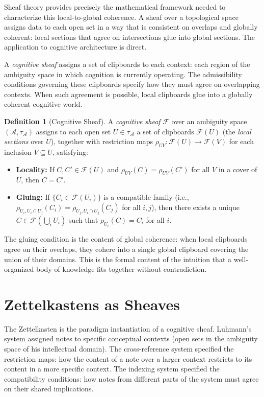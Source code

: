\documentclass[12pt,oneside]{book}
\theoremstyle{plain}
\theoremstyle{definition}
\newtheorem{definition}[theorem]{Definition}
\theoremstyle{plain}
\newcommand{\cA}{\mathcal{A}}
\begin{document}
Sheaf theory provides precisely the mathematical framework needed to characterize this local-to-global coherence. A sheaf over a topological space assigns data to each open set in a way that is consistent on overlaps and globally coherent: local sections that agree on intersections glue into global sections. The application to cognitive architecture is direct.

A \emph{cognitive sheaf} assigns a set of clipboards to each context: each region of the ambiguity space in which cognition is currently operating. The admissibility conditions governing these clipboards specify how they must agree on overlapping contexts. When such agreement is possible, local clipboards glue into a globally coherent cognitive world.

\begin{definition}[Cognitive Sheaf]
A \emph{cognitive sheaf} $\mathcal{F}$ over an ambiguity space $(\cA, \tau_\cA)$ assigns to each open set $U \in \tau_\cA$ a set of clipboards $\mathcal{F}(U)$ (the \emph{local sections} over $U$), together with restriction maps $\rho_{UV} : \mathcal{F}(U) \to \mathcal{F}(V)$ for each inclusion $V \subseteq U$, satisfying:
\begin{itemize}[noitemsep]
\item[(i)] \textbf{Locality:} If $C, C' \in \mathcal{F}(U)$ and $\rho_{UV}(C) = \rho_{UV}(C')$ for all $V$ in a cover of $U$, then $C = C'$.
\item[(ii)] \textbf{Gluing:} If $\{C_i \in \mathcal{F}(U_i)\}$ is a compatible family (i.e., $\rho_{U_i, U_i \cap U_j}(C_i) = \rho_{U_j, U_i \cap U_j}(C_j)$ for all $i, j$), then there exists a unique $C \in \mathcal{F}(\bigcup_i U_i)$ such that $\rho_{U_i}(C) = C_i$ for all $i$.
\end{itemize}
\end{definition}

The gluing condition is the content of global coherence: when local clipboards agree on their overlaps, they cohere into a single global clipboard covering the union of their domains. This is the formal content of the intuition that a well-organized body of knowledge fits together without contradiction.

\section{Zettelkastens as Sheaves}

The Zettelkasten is the paradigm instantiation of a cognitive sheaf. Luhmann's system assigned notes to specific conceptual contexts (open sets in the ambiguity space of his intellectual domain). The cross-reference system specified the restriction maps: how the content of a note over a larger context restricts to its content in a more specific context. The indexing system specified the compatibility conditions: how notes from different parts of the system must agree on their shared implications.
\end{document}

